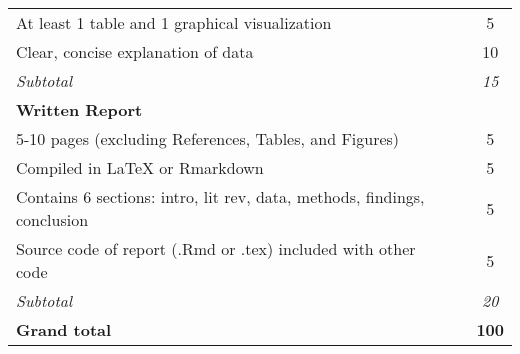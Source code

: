 \documentclass[12pt,english]{article}
\begin{document}
\begin{center}
{\begin{tabular}{l|c|c}
At least 1 table and 1 graphical visualization                                               &               & 5                       \\
Clear, concise explanation of data                                                           &               & 10                       \\
\hline
\textit{Subtotal}                                                                            &               & \textit{15}              \\
\hline
\textbf{Written Report}                                                                      &               &                          \\
5-10 pages (excluding References, Tables, and Figures)                                       &               & 5                       \\
Compiled in LaTeX or Rmarkdown                                                               &               & 5                       \\
Contains 6 sections: intro, lit rev, data, methods, findings, conclusion                     &               & 5                       \\
Source code of report (.Rmd or .tex) included with other code                                &               & 5                       \\
\hline
\textit{Subtotal}                                                                            &               & \textit{20}              \\
\hline
\textbf{Grand total}                                                                         &               & \textbf{100}            \\
\hline
\end{tabular}
}
\end{center}

\end{document}

